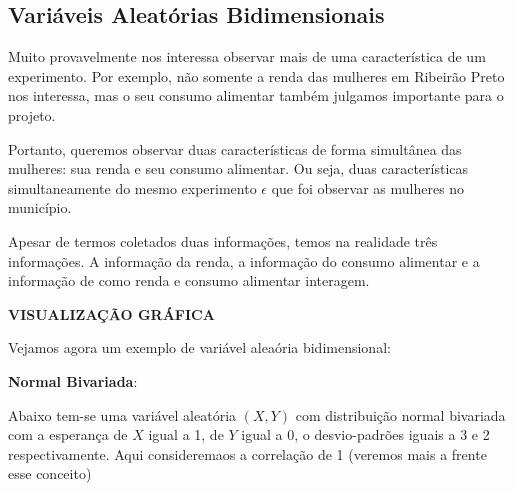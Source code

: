 \documentclass[
  letterpaper,
  DIV=11,
  numbers=noendperiod]{scrreprt}
\begin{document}
\subsection{Variáveis Aleatórias
Bidimensionais}\label{variuxe1veis-aleatuxf3rias-bidimensionais}

Muito provavelmente nos interessa observar mais de uma característica de
um experimento. Por exemplo, não somente a renda das mulheres em
Ribeirão Preto nos interessa, mas o seu consumo alimentar também
julgamos importante para o projeto.

Portanto, queremos observar duas características de forma simultânea das
mulheres: sua renda e seu consumo alimentar. Ou seja, duas
características simultaneamente do mesmo experimento \(\epsilon\) que
foi observar as mulheres no município.

Apesar de termos coletados duas informações, temos na realidade três
informações. A informação da renda, a informação do consumo alimentar e
a informação de como renda e consumo alimentar interagem.

\textbf{VISUALIZAÇÃO GRÁFICA}

Vejamos agora um exemplo de variável aleaória bidimensional:

\textbf{Normal Bivariada}:

Abaixo tem-se uma variável aleatória \((X,Y)\) com distribuição normal
bivariada com a esperança de \(X\) igual a 1, de \(Y\) igual a 0, o
desvio-padrões iguais a 3 e 2 respectivamente. Aqui consideremaos a
correlação de 1 (veremos mais a frente esse conceito)
\end{document}
